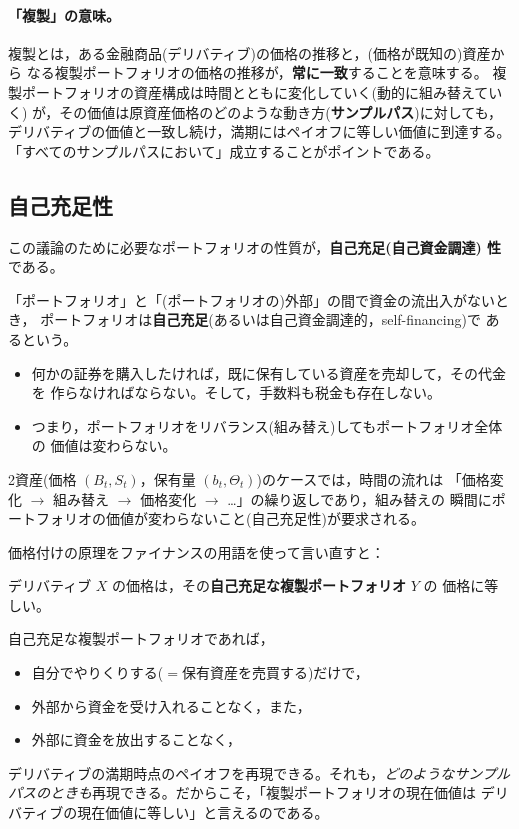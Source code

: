 \paragraph{「複製」の意味。}
複製とは，ある金融商品(デリバティブ)の価格の推移と，(価格が既知の)資産から
なる複製ポートフォリオの価格の推移が，\textbf{常に一致}することを意味する。
複製ポートフォリオの資産構成は時間とともに変化していく(動的に組み替えていく)
が，その価値は原資産価格のどのような動き方(\textbf{サンプルパス})に対しても，
デリバティブの価値と一致し続け，満期にはペイオフに等しい価値に到達する。
「すべてのサンプルパスにおいて」成立することがポイントである。

\subsection{自己充足性}

この議論のために必要なポートフォリオの性質が，\textbf{自己充足(自己資金調達)
性}である。

\begin{definition}[自己充足性]
「ポートフォリオ」と「(ポートフォリオの)外部」の間で資金の流出入がないとき，
ポートフォリオは\textbf{自己充足}(あるいは自己資金調達的，self-financing)で
あるという。
\end{definition}

\begin{itemize}
\item 何かの証券を購入したければ，既に保有している資産を売却して，その代金を
作らなければならない。そして，手数料も税金も存在しない。
\item つまり，ポートフォリオをリバランス(組み替え)してもポートフォリオ全体の
価値は変わらない。
\end{itemize}

2資産(価格 $(B_t, S_t)$，保有量 $(b_t,\Theta_t)$)のケースでは，時間の流れは
「価格変化 $\to$ 組み替え $\to$ 価格変化 $\to$ …」の繰り返しであり，組み替えの
瞬間にポートフォリオの価値が変わらないこと(自己充足性)が要求される。

価格付けの原理をファイナンスの用語を使って言い直すと：
\begin{keypoint}
デリバティブ $X$ の価格は，その\textbf{自己充足な複製ポートフォリオ} $Y$ の
価格に等しい。
\end{keypoint}

自己充足な複製ポートフォリオであれば，
\begin{itemize}
\item 自分でやりくりする($=$保有資産を売買する)だけで，
\item 外部から資金を受け入れることなく，また，
\item 外部に資金を放出することなく，
\end{itemize}
デリバティブの満期時点のペイオフを再現できる。それも，\emph{どのようなサンプル
パスのときも}再現できる。だからこそ，「複製ポートフォリオの現在価値は
デリバティブの現在価値に等しい」と言えるのである。

